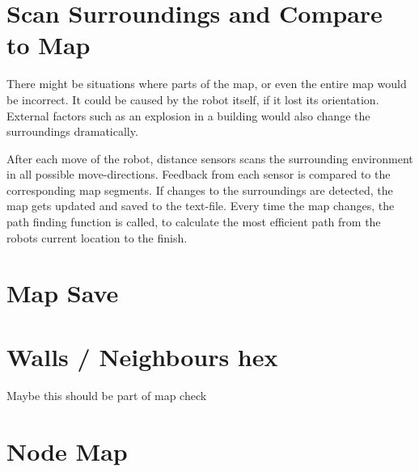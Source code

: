\section{Scan Surroundings and Compare to Map}
\label{sec:map_check} %
There might be situations where parts of the map, or even the entire map would be incorrect.
It could be caused by the robot itself, if it lost its orientation. 
External factors such as an explosion in a building would also change the surroundings dramatically.
 
After each move of the robot, distance sensors scans the surrounding environment in all possible move-directions.
Feedback from each sensor is compared to the corresponding map segments. 
If changes to the surroundings are detected, the map gets updated and saved to the text-file.
Every time the map changes, the path finding function is called, to calculate the most efficient path from the robots current location to the finish. 



\section{Map Save}
\label{sec:map_save} %

\section{Walls / Neighbours hex}
\label{sec:map_hex} %
Maybe this should be part of map check

\section{Node Map}
\label{sec:map_node} %



